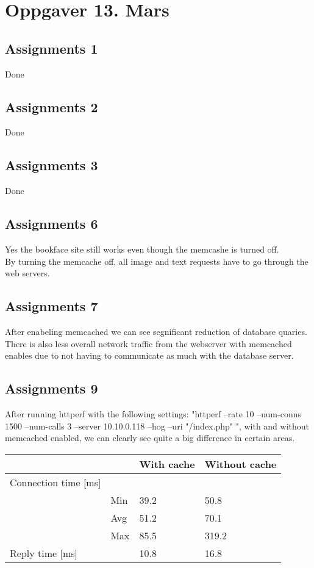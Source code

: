 \section{Oppgaver 13. Mars}

\subsection{Assignments 1} 
Done

\subsection{Assignments 2} 
Done

\subsection{Assignments 3} 
Done

\subsection{Assignments 6} 
Yes the bookface site still works even though the memcashe is turned off. \\
By turning the memcache off, all image and text requests have to go through the web servers.

\subsection{Assignments 7} 
After enabeling memcached we can see segnificant reduction of database quaries. There is also less overall network traffic from the webserver with memcached enables due to not having to communicate as much with the database server. 

\subsection{Assignments 9} 
After running httperf with the following settings: "httperf --rate 10 --num-conns 1500 --num-calls 3 --server 10.10.0.118 --hog --uri "/index.php" ", with and without memcached enabled, we can clearly see quite a big difference in certain areas.

\begin{table}[h]
\begin{tabular}{|ll|l|l|}
\hline
                                               &     & With cache & Without cache \\ \hline
\multicolumn{1}{|l|}{Connection time {[}ms{]}} &     &            &               \\
\multicolumn{1}{|l|}{}                         & Min & 39.2       & 50.8          \\ \cline{2-4} 
\multicolumn{1}{|l|}{}                         & Avg & 51.2       & 70.1          \\ \cline{2-4} 
\multicolumn{1}{|l|}{}                         & Max & 85.5       & 319.2         \\ \hline
\multicolumn{1}{|l|}{Reply time {[}ms{]}}      &     & 10.8       & 16.8          \\ \hline
\end{tabular}
\end{table}

